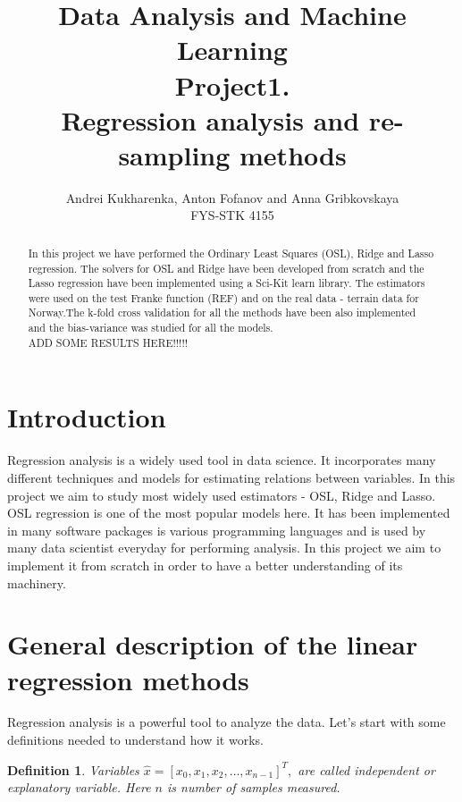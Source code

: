 \documentclass[10pt]{article}
\newtheorem{defn}{Definition}
\begin{document}
\setlength\parindent{1pt}
\title{Data Analysis and Machine Learning \\
Project1.\\ Regression analysis and re-sampling methods}
\author{Andrei Kukharenka, Anton Fofanov and Anna Gribkovskaya \\  
FYS-STK 4155 
}

\maketitle
\begin{abstract}
In this project we have performed the Ordinary Least Squares (OSL), Ridge and Lasso regression. The solvers for OSL and Ridge have been developed from scratch and the Lasso regression have been implemented using a Sci-Kit learn library. The estimators were used on the test Franke function (REF) and on the real data - terrain data for Norway.The k-fold cross validation for all the methods have been also implemented and the bias-variance was studied for all the models.\\
ADD SOME RESULTS HERE!!!!!
\end{abstract}
\clearpage 


\section{Introduction}
Regression analysis is a widely used tool in data science. It incorporates many different techniques and models for estimating relations between variables. In this project we aim to study most widely used estimators - OSL, Ridge and Lasso.\\
OSL regression is one of the most popular models here. It has been implemented in many software packages is various programming languages and is used by many data scientist everyday for performing analysis. In this project we aim to implement it from scratch in order to have a better understanding of its machinery.

\section{General description of the linear regression methods}
Regression analysis is a powerful tool to analyze the data. Let's start with some definitions needed to understand how it works.
\begin{defn}
Variables $\hat{x} = [x_0,x_1, x_2,\dots, x_{n-1}]^T,$ are called independent  or explanatory variable. Here $n$ is number of samples measured.
\end{defn}
\end{document}
